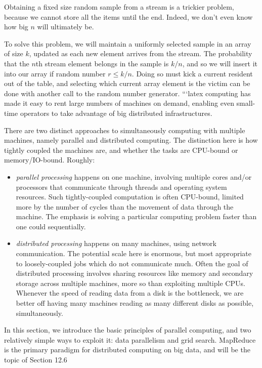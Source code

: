 \documentclass[10pt]{article}
\begin{document}
\begin{enumerate}
Obtaining a fixed size random sample from a stream is a trickier problem, because we cannot store all the items until the end. Indeed, we don’t even know how big $n$ will ultimately be.

To solve this problem, we will maintain a uniformly selected sample in an array of size $k$, updated as each new element arrives from the stream. The probability that the $n$th stream element belongs in the sample is $k/n$, and so we will insert it into our array if random number $r \leq k/n$. Doing so must kick a current resident out of the table, and selecting which current array element is the victim can be done with another call to the random number generator.
```latex
computing has made it easy to rent large numbers of machines on demand, enabling even small-time operators to take advantage of big distributed infrastructures.

There are two distinct approaches to simultaneously computing with multiple machines, namely parallel and distributed computing. The distinction here is how tightly coupled the machines are, and whether the tasks are CPU-bound or memory/IO-bound. Roughly:

\begin{itemize}
  \item \textit{parallel processing} happens on one machine, involving multiple cores and/or processors that communicate through threads and operating system resources. Such tightly-coupled computation is often CPU-bound, limited more by the number of cycles than the movement of data through the machine. The emphasis is solving a particular computing problem faster than one could sequentially.
  \item \textit{distributed processing} happens on many machines, using network communication. The potential scale here is enormous, but most appropriate to loosely-coupled jobs which do not communicate much. Often the goal of distributed processing involves sharing resources like memory and secondary storage across multiple machines, more so than exploiting multiple CPUs. Whenever the speed of reading data from a disk is the bottleneck, we are better off having many machines reading as many different disks as possible, simultaneously.
\end{itemize}

In this section, we introduce the basic principles of parallel computing, and two relatively simple ways to exploit it: data parallelism and grid search. MapReduce is the primary paradigm for distributed computing on big data, and will be the topic of Section 12.6


\end{enumerate}
\end{document}
